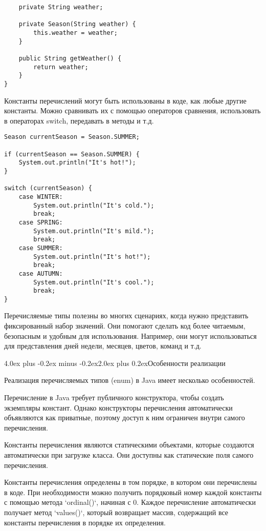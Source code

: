 \documentclass[12pt, a4paper]{book}%
\makeatletter
\renewcommand{\section}{\@startsection{section}{1}{1pt}%
{4.0ex plus -0.2ex minus -0.2ex}{2.0ex plus 0.2ex}{\centering\bf}}%
\makeatother
\begin{document}
{\begin{lstlisting}
    private String weather;

    private Season(String weather) {
        this.weather = weather;
    }

    public String getWeather() {
        return weather;
    }
}

\end{lstlisting}

Константы перечислений могут быть использованы в коде, как любые другие константы. Можно сравнивать их с помощью операторов сравнения, использовать в операторах switch, передавать в методы и т.д.

 \begin{lstlisting}
Season currentSeason = Season.SUMMER;

if (currentSeason == Season.SUMMER) {
    System.out.println("It's hot!");
}

switch (currentSeason) {
    case WINTER:
        System.out.println("It's cold.");
        break;
    case SPRING:
        System.out.println("It's mild.");
        break;
    case SUMMER:
        System.out.println("It's hot!");
        break;
    case AUTUMN:
        System.out.println("It's cool.");
        break;
}

\end{lstlisting}

Перечисляемые типы полезны во многих сценариях, когда нужно представить фиксированный набор значений. Они помогают сделать код более читаемым, безопасным и удобным для использования. Например, они могут использоваться для представления дней недели, месяцев, цветов, команд и т.д.

\section{Особенности реализации}

Реализация перечисляемых типов (enum) в Java имеет несколько особенностей.

Перечисление в Java требует публичного конструктора, чтобы создать экземпляры констант. Однако конструкторы перечисления автоматически объявляются как приватные, поэтому доступ к ним ограничен внутри самого перечисления.

Константы перечисления являются статическими объектами, которые создаются автоматически при загрузке класса. Они доступны как статические поля самого перечисления.

Константы перечисления определены в том порядке, в котором они перечислены в коде. При необходимости можно получить порядковый номер каждой константы с помощью метода `ordinal()`, начиная с 0. Каждое перечисление автоматически получает метод `values()`, который возвращает массив, содержащий все константы перечисления в порядке их определения.

}
\end{document}
